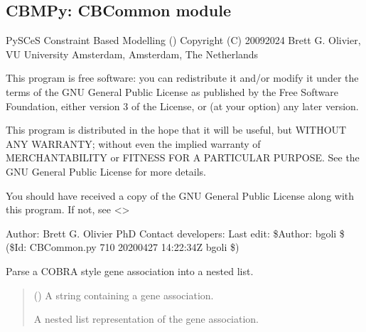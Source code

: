 \documentclass[letterpaper,12pt,english]{sphinxmanual}
\begin{document}
\subsection{CBMPy: CBCommon module}
\label{\detokenize{api/core:cbmpy-cbcommon-module}}\label{\detokenize{api/core:module-cbmpy.CBCommon}}
\sphinxAtStartPar
PySCeS Constraint Based Modelling ()
Copyright (C) 2009\sphinxhyphen{}2024 Brett G. Olivier, VU University Amsterdam, Amsterdam, The Netherlands

\sphinxAtStartPar
This program is free software: you can redistribute it and/or modify
it under the terms of the GNU General Public License as published by
the Free Software Foundation, either version 3 of the License, or
(at your option) any later version.

\sphinxAtStartPar
This program is distributed in the hope that it will be useful,
but WITHOUT ANY WARRANTY; without even the implied warranty of
MERCHANTABILITY or FITNESS FOR A PARTICULAR PURPOSE.  See the
GNU General Public License for more details.

\sphinxAtStartPar
You should have received a copy of the GNU General Public License
along with this program.  If not, see \textless{}\textgreater{}

\sphinxAtStartPar
Author: Brett G. Olivier PhD
Contact developers: 
Last edit: \$Author: bgoli \$ (\$Id: CBCommon.py 710 2020\sphinxhyphen{}04\sphinxhyphen{}27 14:22:34Z bgoli \$)

\begin{fulllineitems}
\label{\detokenize{api/core:cbmpy.CBCommon.parseGeneAssociation}}
\pysigstartsignatures
\pysiglinewithargsret
{}
{}
{}
\pysigstopsignatures
\sphinxAtStartPar
Parse a COBRA style gene association into a nested list.
\begin{quote}\begin{description}
\sphinxAtStartPar
{} () \textendash{} A string containing a gene association.

\sphinxAtStartPar
{} \textendash{} A nested list representation of the gene association.

\end{description}\end{quote}

\end{fulllineitems}
\end{document}
